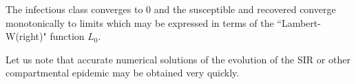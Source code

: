 \im The infectious class
converges to $0$ and the susceptible and recovered converge monotonically to limits which may be expressed in terms of the ``Lambert-W(right)" function $L_0$.
\EEN




Let us note that accurate numerical solutions of  the evolution of the SIR or other compartmental epidemic may be obtained very quickly.


